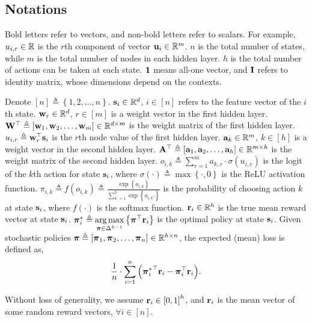 \subsection{Notations}
\label{subsec:notations}

Bold letters refer to vectors, and non-bold letters refer to scalars. For example, $u_{i,r} \in {\mathbb{R}}$ is the $r$th component of vector ${\mathbf{u}}_i \in {\mathbb{R}}^m$. $n$ is the total number of states, while $m$ is the total number of nodes in each hidden layer. $h$ is the total number of actions can be taken at each state. ${\mathbf{1}}$ means all-one vector, and ${\mathbf{I}}$ refers to identity matrix, whose dimensions depend on the contexts.

Denote $[n] \triangleq \left\{ 1,2, \dots, n \right\}$. ${\mathbf{s}}_i \in {\mathbb{R}}^d$, $i \in [n]$ refers to the feature vector of the $i$th state. ${\mathbf{w}}_r \in {\mathbb{R}}^d$, $r \in [m]$ is a weight vector in the first hidden layer. ${\mathbf{W}}^\top \triangleq \left[ {\mathbf{w}}_1, {\mathbf{w}}_2, \dots, {\mathbf{w}}_m \right] \in {\mathbb{R}}^{d \times m}$ is the weight matrix of the first hidden layer. $u_{i,r} \triangleq {\mathbf{w}}_r^\top {\mathbf{s}}_i$ is the $r$th node value of the first hidden layer. ${\mathbf{a}}_k \in {\mathbb{R}}^m$, $k \in [h]$ is a weight vector in the second hidden layer. ${\mathbf{A}}^\top \triangleq \left[ {\mathbf{a}}_1, {\mathbf{a}}_2, \dots, {\mathbf{a}}_h \right] \in {\mathbb{R}}^{m \times h}$ is the weight matrix of the second hidden layer. $o_{i,k} \triangleq \sum\limits_{r=1}^{m}{a_{k,r} \cdot \sigma\left( u_{i,r} \right)}$ is the logit of the $k$th action for state ${\mathbf{s}}_i$, where $\sigma(\cdot) \triangleq \max\left\{ \cdot, 0 \right\}$ is the ReLU activation function. $\pi_{i,k} \triangleq f\left( o_{i,k} \right) \triangleq \frac{\exp\left\{ o_{i,k} \right\}}{\sum\limits_{k^\prime = 1}^{h}{\exp\left\{ o_{i,k^\prime} \right\}}}$ is the probability of choosing action $k$ at state ${\mathbf{s}}_i$, where $f(\cdot)$ is the softmax function. ${\mathbf{r}}_i \in {\mathbb{R}}^h$ is the true mean reward vector at state ${\mathbf{s}}_i$. ${\boldsymbol{\pi}}_i^* \triangleq \operatorname*{arg\,max}\limits_{{\boldsymbol{\pi}} \in \Delta^{h-1}}{\left\{ {\boldsymbol{\pi}}^\top {\mathbf{r}}_i \right\}}$ is the optimal policy at state ${\mathbf{s}}_i$. Given stochastic policies ${\boldsymbol{\pi}} \triangleq \left[ {\boldsymbol{\pi}}_1, {\boldsymbol{\pi}}_2, \dots, {\boldsymbol{\pi}}_n \right] \in {\mathbb{R}}^{h \times n}$, the expected (mean) loss is defined as,
\begin{equation}
\label{eq:expected_loss}
\begin{split}
    \frac{1}{n} \cdot \sum\limits_{i=1}^{n}{ \left( {{\boldsymbol{\pi}}_i^*}^\top {\mathbf{r}}_i - {\boldsymbol{\pi}}_i^\top {\mathbf{r}}_i \right) }.
\end{split}
\end{equation}

Without loss of generality, we assume ${\mathbf{r}}_i \in \left[ 0, 1 \right]^h$, and ${\mathbf{r}}_i$ is the mean vector of some random reward vectors,  $\forall i \in [n]$.